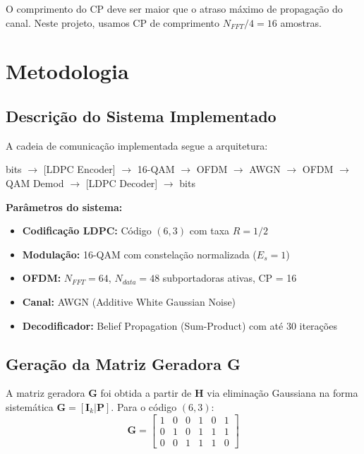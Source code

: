 \documentclass[conference]{IEEEtran}
\begin{document}
O comprimento do CP deve ser maior que o atraso máximo de propagação do canal. Neste projeto, usamos CP de comprimento $N_{FFT}/4 = 16$ amostras.

\section{Metodologia}

\subsection{Descrição do Sistema Implementado}

A cadeia de comunicação implementada segue a arquitetura:

\begin{center}
bits $\rightarrow$ [LDPC Encoder] $\rightarrow$ 16-QAM $\rightarrow$ OFDM $\rightarrow$ AWGN $\rightarrow$ OFDM $\rightarrow$ QAM Demod $\rightarrow$ [LDPC Decoder] $\rightarrow$ bits
\end{center}

\textbf{Parâmetros do sistema:}
\begin{itemize}
    \item \textbf{Codificação LDPC:} Código $(6,3)$ com taxa $R = 1/2$
    \item \textbf{Modulação:} 16-QAM com constelação normalizada ($E_s = 1$)
    \item \textbf{OFDM:} $N_{FFT} = 64$, $N_{data} = 48$ subportadoras ativas, CP = 16
    \item \textbf{Canal:} AWGN (Additive White Gaussian Noise)
    \item \textbf{Decodificador:} Belief Propagation (Sum-Product) com até 30 iterações
\end{itemize}

\subsection{Geração da Matriz Geradora G}

A matriz geradora $\mathbf{G}$ foi obtida a partir de $\mathbf{H}$ via eliminação Gaussiana na forma sistemática $\mathbf{G} = [\mathbf{I}_k | \mathbf{P}]$. Para o código $(6,3)$:
\begin{equation}
    \mathbf{G} = \begin{bmatrix}
    1 & 0 & 0 & 1 & 0 & 1 \\
    0 & 1 & 0 & 1 & 1 & 1 \\
    0 & 0 & 1 & 1 & 1 & 0
    \end{bmatrix}
\end{equation}
\end{document}
